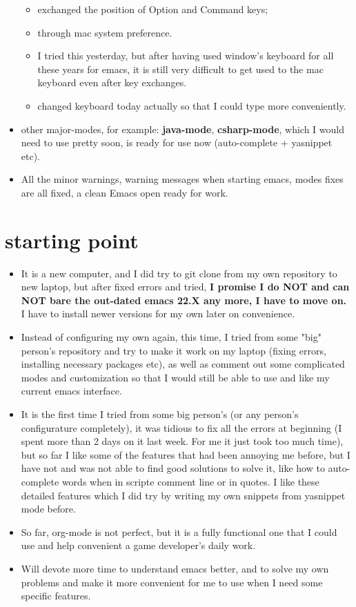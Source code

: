 \documentclass[9pt, b5paper]{article}
\begin{document}
\begin{itemize}
\begin{itemize}
\item exchanged the position of Option and Command keys;
\item through mac system preference.
\item I tried this yesterday, but after having used window's keyboard for all these years for emacs, it is still very difficult to get used to the mac keyboard even after key exchanges.
\item changed keyboard today actually so that I could type more conveniently.
\end{itemize}
\item other major-modes, for example: \textbf{java-mode}, \textbf{csharp-mode}, which I would need to use pretty soon, is ready for use now (auto-complete + yasnippet etc).
\item All the minor warnings, warning messages when starting emacs, modes fixes are all fixed, a clean Emacs open ready for work.
\end{itemize}

\section{starting point}
\label{sec-2}
\begin{itemize}
\item It is a new computer, and I did try to git clone from my own repository to new laptop, but after fixed errors and tried, \textbf{I promise I do NOT and can NOT bare the out-dated emacs 22.X any more, I have to move on.} I have to install newer versions for my own later on convenience.
\item Instead of configuring my own again, this time, I tried from some "big" person's repository and try to make it work on my laptop (fixing errors, installing necessary packages etc), as well as comment out some complicated modes and customization so that I would still be able to use and like my current emacs interface.
\item It is the first time I tried from some big person's (or any person's configurature completely), it was tidious to fix all the errors at beginning (I spent more than 2 days on it last week. For me it just took too much time), but so far I like some of the features that had been annoying me before, but I have not and was not able to find good solutions to solve it, like how to auto-complete words when in scripte comment line or in quotes. I like these detailed features which I did try by writing my own snippets from yasnippet mode before.
\item So far, org-mode is not perfect, but it is a fully functional one that I could use and help convenient a game developer's daily work.
\item Will devote more time to understand emacs better, and to solve my own problems and make it more convenient for me to use when I need some specific features.
\end{itemize}
\end{document}
